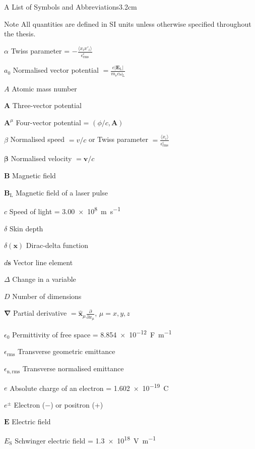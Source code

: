 \begin{mclistof}{A List of Symbols and Abbreviations}{3.2cm}
\item[Note] All quantities are defined in SI units unless otherwise specified throughout the thesis.
\item[$\alpha$] Twiss parameter = $-\frac{\langle x_i x'_i \rangle}{\epsilon^i_\mathrm{rms}}$
\item[$a_0$] Normalised vector potential $= \frac{e|\mathbf{E}_\mathrm{L}|}{m_\mathrm{e}c\omega_\mathrm{L}}$
\item[$A$] Atomic mass number
\item[$\mathbf{A}$] Three-vector potential
\item[$\mathbf{A}^\mu$] Four-vector potential = $(\phi/c, \mathbf{A})$
\item[$\beta$] Normalised speed $= v/c$ or Twiss parameter $= \frac{\langle x_i \rangle}{\epsilon^i_\mathrm{rms}}$
\item[$\mathbf{\beta}$] Normalised velocity $= \mathbf{v}/c$
\item[$\mathbf{B}$] Magnetic field
\item[$\mathbf{B}_\mathrm{L}$] Magnetic field of a laser pulse
\item[$c$] Speed of light = \qty{3.00e8}{m.s^{-1}}
\item[$\delta$] Skin depth
\item[$\delta(\mathbf{x})$] Dirac-delta function
\item[$d\mathbf{s}$] Vector line element
\item[$\Delta$] Change in a variable
\item[$D$] Number of dimensions
\item[$\mathbf{\nabla}$] Partial derivative $= \hat{\mathbf{x}}_\mu \frac{\partial }{\partial x_\mu}$, $\mu = x,y,z$
\item[$\epsilon_0$] Permittivity of free space = \qty{8.854e-12}{F.m^{-1}}
\item[$\epsilon_\mathrm{rms}$] Transverse geometric emittance
\item[$\epsilon_\mathrm{n,rms}$] Transverse normalised emittance
\item[$e$] Absolute charge of an electron = \qty{1.602e-19}{C}
\item[$e^\pm$] Electron ($-$) or positron (+)
\item[$\mathbf{E}$] Electric field
\item[$E_\mathrm{S}$] Schwinger electric field = \qty{1.3e18}{V.m^{-1}}

\end{mclistof}
